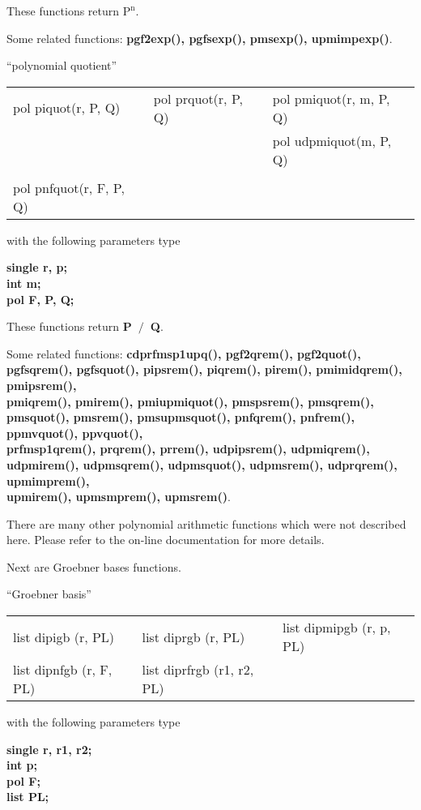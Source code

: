 These functions return {\bf $\mbox{P}^{\mbox{n}}$}.

Some related functions:\hspace*{0.7em}
{\bf  pgf2exp(), pgfsexp(), pmsexp(), upmimpexp()}.

\newpage

\begin{center} ``polynomial quotient'' \end{center}
\begin{center}
{\bf
\begin{tabular}{lll}
pol piquot(r, P, Q) & pol prquot(r, P, Q) & pol pmiquot(r, m, P, Q)\\
                    &                     & pol udpmiquot(m, P, Q)\\
&&\\
pol pnfquot(r, F, P, Q) &&\\
\end{tabular} }
\end{center}
\parbox[t]{2.5in}{with the following parameters type}
\parbox[t]{3.0in}{\bf single r, p;\\
                      int m;\\
                      pol F, P, Q;}

These functions return {\bf P~$/$~Q}.

Some related functions:\hspace*{0.7em}
{\bf  cdprfmsp1upq(), pgf2qrem(), pgf2quot(), pgfsqrem(), pgfsquot(), pipsrem(), piqrem(), 
pirem(), pmimidqrem(), pmipsrem(), \\
pmiqrem(), pmirem(), 
pmiupmiquot(), pmspsrem(), pmsqrem(), pmsquot(), pmsrem(), pmsupmsquot(), 
pnfqrem(), pnfrem(), ppmvquot(), ppvquot(), \\
prfmsp1qrem(), prqrem(), prrem(), 
udpipsrem(), udpmiqrem(), udpmirem(), udpmsqrem(), udpmsquot(), udpmsrem(), 
udprqrem(), upmimprem(), \\
upmirem(), upmsmprem(), upmsrem()}.

\leer\leer
There are many other polynomial arithmetic functions which were not described
here. Please refer to the on-line documentation for more details. 

Next are Groebner bases functions.

\begin{center} ``Groebner basis'' \end{center}
\begin{center}
{\bf
\begin{tabular}{lll}
list dipigb (r, PL) & list diprgb (r, PL) & list dipmipgb (r, p, PL)\\
list dipnfgb (r, F, PL) & list diprfrgb (r1, r2, PL) & \\
\end{tabular} }
\end{center}
\parbox[t]{2.5in}{with the following parameters type}
\parbox[t]{3.0in}{\bf single r, r1, r2;\\
                      int p;\\
                      pol F;\\
                      list PL;}

